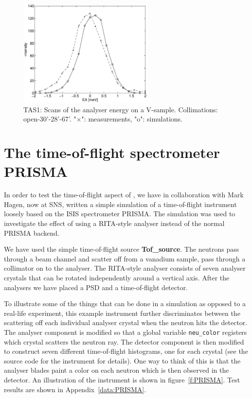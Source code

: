 \begin{figure}
  \begin{center}
    \includegraphics[width=0.6\textwidth]{figures/ea-scan.eps}
  \end{center}
\caption{TAS1: Scans of the analyser energy on a V-sample.
Collimations: open-30'-28'-67'.
"$\times$": measurements, "o": simulations.}
\label{f:v_ea}
\end{figure}


\section{The time-of-flight spectrometer PRISMA}
\label{s:PRISMA}

In order to test the time-of-flight aspect of \MCS, we have
in collaboration with Mark Hagen, now at SNS, written a simple
simulation of a time-of-flight instrument loosely based on the ISIS
spectrometer PRISMA. The simulation was used to investigate the effect
of using a RITA-style analyser instead of the normal PRISMA backend.

We have used the simple time-of-flight source {\bf Tof\_source}.
The neutrons pass through a
beam channel and scatter off from a vanadium sample, pass through
a collimator on to the analyser.
The RITA-style analyser consists of seven analyser crystals
that can be rotated independently around a vertical axis. After the
analysers we have placed a PSD and a time-of-flight detector.

To illustrate some of the things that can be done in a simulation as
opposed to a real-life experiment, this example instrument further
discriminates between
the scattering off each individual analyser crystal
when the neutron hits the detector. The
analyser component is modified so that a global variable
\verb+neu_color+ registers which
crystal scatters the neutron ray. The detector component
is then modified to construct seven different time-of-flight histograms,
one for each crystal (see the source code for the instrument
for details). One way to think of this is that
the analyser blades paint a color on each neutron which is then
observed in the detector.
An illustration of the instrument is shown in figure~\ref{f:PRISMA}.
Test results are shown in Appendix~\ref{data:PRISMA}.

